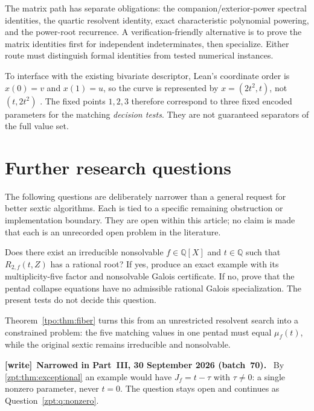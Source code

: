 \documentclass[11pt,letterpaper]{article}
\numberwithin{equation}{section}
\theoremstyle{definition}
\theoremstyle{remark}
\newcommand{\QQ}{\mathbb Q}
\newcommand{\Rtwo}{R_{2,f}}
\newenvironment{writenote}[1][]{\par\smallskip\begingroup\small
 \noindent\textbf{[write]}\if\relax\detokenize{#1}\relax\else~\textbf{#1.}\fi\ }%
 {\par\endgroup\smallskip}
\begin{document}
The matrix path has separate obligations: the companion/exterior-power
spectral identities, the quartic resolvent identity, exact characteristic
polynomial powering, and the power-root recurrence. A verification-friendly
alternative is to prove the matrix identities first for independent
indeterminates, then specialize. Either route must distinguish formal
identities from tested numerical instances.

To interface with the existing bivariate descriptor, Lean's coordinate order
is $x(0)=v$ and $x(1)=u$, so the curve is represented by
$x=(2t^2,t)$, not $(t,2t^2)$ \cite{repo-invariants,tpo:separators}.
The fixed points $1,2,3$ therefore correspond to three fixed encoded
parameters for the matching \emph{decision tests}. They are not guaranteed
separators of the full value set.

\section{Further research questions}
\label{tpo:sec:questions}

The following questions are deliberately narrower than a general request for
better sextic algorithms. Each is tied to a specific remaining obstruction
or implementation boundary. They are open within this article; no claim is
made that each is an unrecorded open problem in the literature.

\begin{question}
\label{zpt:q:tpo-nonempty}
Does there exist an irreducible nonsolvable $f\in\QQ[X]$ and $t\in\QQ$ such
that $\Rtwo(t,Z)$ has a rational root? If yes, produce an exact example with
its multiplicity-five factor and nonsolvable Galois certificate. If no, prove
that the pentad collapse equations have no admissible rational Galois
specialization. The present tests do not decide this question.
\end{question}
Theorem~\ref{tpo:thm:fiber} turns this from an unrestricted resolvent search into
a constrained problem: the five matching values in one pentad must equal
$\mu_f(t)$, while the original sextic remains irreducible and nonsolvable.

\begin{writenote}[Narrowed in Part~III, 30 September 2026 (batch~70)]
By \cref{zpt:thm:exceptional} an example would have $J_f=t-\tau$ with
$\tau\ne0$: a single nonzero parameter, never $t=0$. The question stays open
and continues as Question~\ref{zpt:q:nonzero}.
\end{writenote}
\end{document}
